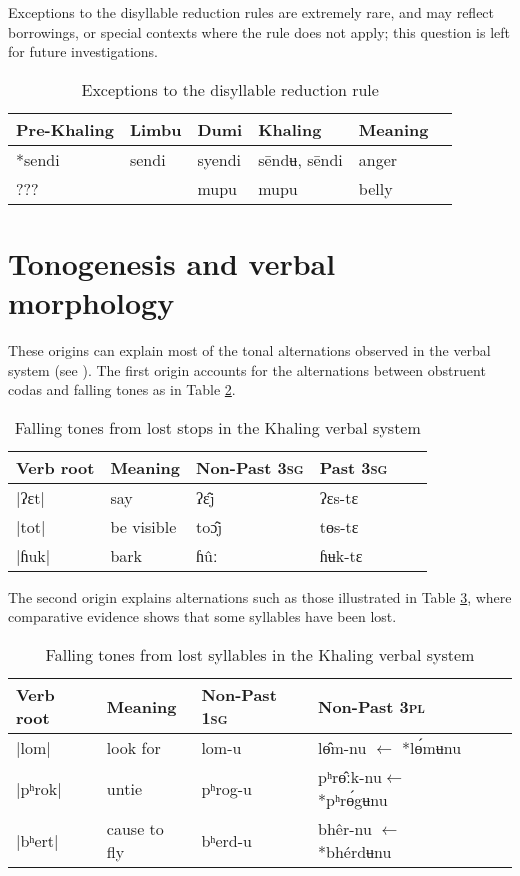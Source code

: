 \documentclass[oldfontcommands,oneside,a4paper,11pt]{article}
\newcommand{\ipa}[1]{{\phon \mbox{#1}}} %
\begin{document}
Exceptions to the disyllable reduction rules are extremely rare, and may reflect borrowings, or special contexts where the rule does not apply; this question is left for future investigations.

\begin{table}[H]
\caption{Exceptions to the disyllable reduction rule} \centering \label{tab:non.reduction}
\begin{tabular}{llllll}
\toprule
Pre-Khaling	&Limbu	&Dumi	&Khaling	&Meaning\\
\midrule
\ipa{*sendi}			&\ipa{sendi}&	\ipa{syendi}	&	\ipa{sēndʉ}, \ipa{sēndi}	&	anger\\
 	???& &	\ipa{mupu}	&	  \ipa{mupu}	&	belly \\
\bottomrule
\end{tabular}
\end{table}
\section{Tonogenesis and verbal morphology} \label{sec:tonogenesis.verb}
These origins can explain most of the tonal alternations observed in the verbal system (see \citealt{jacques12khaling}). The first origin accounts for the alternations between obstruent codas and falling tones as in Table \ref{tab:falling.verb}.

\begin{table}[H]
\caption{Falling tones from lost stops in the Khaling verbal system} \centering \label{tab:falling.verb}
\begin{tabular}{llllll}
\toprule
Verb root	&Meaning	&Non-Past \textsc{3sg} & Past \textsc{3sg}\\
\midrule
|ʔɛt|	&	say			&\ipa{ʔɛ̂j} &\ipa{ʔɛs-tɛ} \\
|tot|	&	be visible			&\ipa{toɔ̂j} &\ipa{tɵs-tɛ} \\
|ɦuk|	&	bark			&\ipa{ɦûː} &\ipa{ɦʉk-tɛ} \\
\bottomrule
\end{tabular}
\end{table}
 
 The second origin explains   alternations such as those illustrated in Table  \ref{tab:falling.verb2}, where comparative evidence shows that some syllables have been lost.
\begin{table}[H]
\caption{Falling tones from lost syllables in the Khaling verbal system} \centering \label{tab:falling.verb2}
\begin{tabular}{llllll}
\toprule
Verb root	&Meaning	&Non-Past \textsc{1sg} & Non-Past \textsc{3pl} \\
\midrule
|lom|	&	look for		&\ipa{lom-u} &\ipa{lɵ̂m-nu} $\leftarrow$ *lɵ́mʉnu\\
|pʰrok|	&	untie		&\ipa{pʰrog-u} &\ipa{pʰrɵ̂ːk-nu}$\leftarrow$ *pʰrɵ́gʉnu \\
|bʰert|	&	cause to fly			&\ipa{bʰerd-u} &\ipa{bhêr-nu} $\leftarrow$ *bhérdʉnu \\
\bottomrule
\end{tabular}
\end{table}
\end{document}
